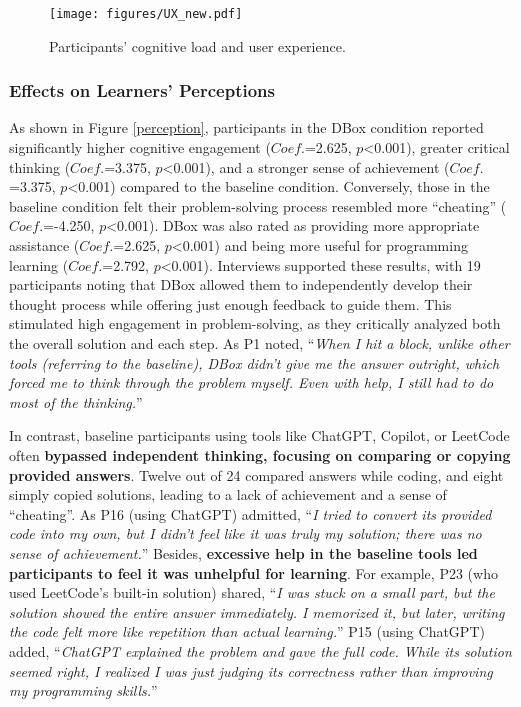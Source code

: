 \begin{figure*}[htbp]
	\centering 
	\texttt{[image: figures/UX\_new.pdf]}
	\caption{Participants' cognitive load and user experience.}
	\label{UX}
        \Description{}
\end{figure*}


\subsubsection{Effects on Learners' Perceptions}

As shown in Figure \ref{perception}, participants in the DBox condition reported significantly higher cognitive engagement ($Coef.$=2.625, $p$<0.001), greater critical thinking ($Coef.$=3.375, $p$<0.001), and a stronger sense of achievement ($Coef.$=3.375, $p$<0.001) compared to the baseline condition. Conversely, those in the baseline condition felt their problem-solving process resembled more ``cheating'' ($Coef.$=-4.250, $p$<0.001). DBox was also rated as providing more appropriate assistance ($Coef.$=2.625, $p$<0.001) and being more useful for programming learning ($Coef.$=2.792, $p$<0.001). Interviews supported these results, with 19 participants noting that DBox allowed them to independently develop their thought process while offering just enough feedback to guide them. This stimulated high engagement in problem-solving, as they critically analyzed both the overall solution and each step. As P1 noted, ``\emph{When I hit a block, unlike other tools (referring to the baseline), DBox didn’t give me the answer outright, which forced me to think through the problem myself. Even with help, I still had to do most of the thinking.}''

In contrast, baseline participants using tools like ChatGPT, Copilot, or LeetCode often \textbf{bypassed independent thinking, focusing on comparing or copying provided answers}. Twelve out of 24 compared answers while coding, and eight simply copied solutions, leading to a lack of achievement and a sense of ``cheating''. As P16 (using ChatGPT) admitted, ``\emph{I tried to convert its provided code into my own, but I didn’t feel like it was truly my solution; there was no sense of achievement.}'' Besides, \textbf{excessive help in the baseline tools led participants to feel it was unhelpful for learning}. For example, P23 (who used LeetCode’s built-in solution) shared, ``\emph{I was stuck on a small part, but the solution showed the entire answer immediately. I memorized it, but later, writing the code felt more like repetition than actual learning.}'' P15 (using ChatGPT) added, ``\emph{ChatGPT explained the problem and gave the full code. While its solution seemed right, I realized I was just judging its correctness rather than improving my programming skills.}''

